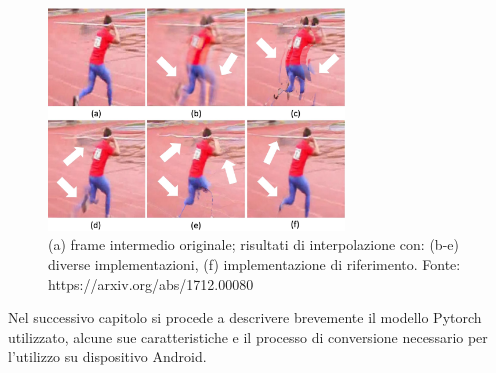 \newpage

\begin{figure}[t!]
    \includegraphics[width=0.7\textwidth]{img/confronto_interpolazione_frame.jpg}
    \centering
    \caption{(a) frame intermedio originale; risultati di interpolazione con: (b-e) diverse implementazioni, (f) implementazione
    di riferimento. Fonte: https://arxiv.org/abs/1712.00080}
    \label{fig:confronto_interpolazione_frame}
\end{figure}

Nel successivo capitolo si procede a descrivere brevemente il modello Pytorch utilizzato, alcune sue caratteristiche
e il processo di conversione necessario per l'utilizzo su dispositivo Android.